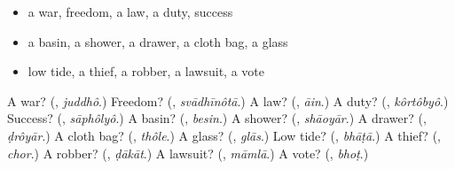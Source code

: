\begin{itemize}
\raggedright
  \item a war, freedom, a law, a duty, success
  \item a basin, a shower, a drawer, a cloth bag, a glass
  \item low tide, a thief, a robber, a lawsuit, a vote
\end{itemize}

\begin{tcolorbox}[breakable,colback=teal!4,colframe=teal!35!black,title={Before you move on}]
A war? (\textbf{}, \emph{juddhô}.) Freedom? (\textbf{}, \emph{svādhīnôtā}.) A law? (\textbf{}, \emph{āin}.) A duty? (\textbf{}, \emph{kôrtôbyô}.) Success? (\textbf{}, \emph{sāphôlyô}.) A basin? (\textbf{}, \emph{besin}.) A shower? (\textbf{}, \emph{shāoyār}.) A drawer? (\textbf{}, \emph{ḍrôyār}.) A cloth bag? (\textbf{}, \emph{thôle}.) A glass? (\textbf{}, \emph{glās}.) Low tide? (\textbf{}, \emph{bhāṭā}.) A thief? (\textbf{}, \emph{chor}.) A robber? (\textbf{}, \emph{ḍākāt}.) A lawsuit? (\textbf{}, \emph{māmlā}.) A vote? (\textbf{}, \emph{bhoṭ}.)
\end{tcolorbox}
